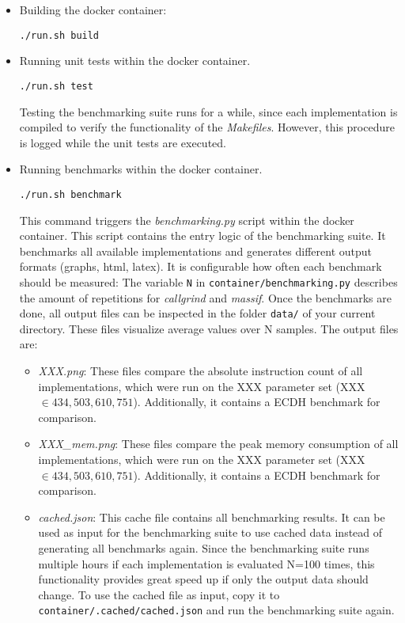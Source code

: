 \begin{itemize}
\item Building the docker container:
\begin{lstlisting}[numbers=none,linewidth=4cm]
./run.sh build
\end{lstlisting}

\item Running unit tests within the docker container.
\begin{lstlisting}[numbers=none,linewidth=4cm]
./run.sh test
\end{lstlisting}
Testing the benchmarking suite runs for a while, since each implementation is compiled to verify the functionality of the \textit{Makefiles}. However, this procedure is logged while the unit tests are executed.

\item Running benchmarks within the docker container.
\begin{lstlisting}[numbers=none,linewidth=4cm]
./run.sh benchmark
\end{lstlisting}
This command triggers the \textit{benchmarking.py} script within the docker container. This script contains the entry logic of the benchmarking suite. It benchmarks all available implementations and generates different output formats (graphs, html, latex). It is configurable how often each benchmark should be measured: The variable \texttt{N} in \texttt{container/benchmarking.py} describes the amount of repetitions for \textit{callgrind} and \textit{massif}. Once the benchmarks are done, all output files can be inspected in the folder \texttt{data/} of your current directory. These files visualize average values over N samples. The output files are:
	\begin{itemize}
	\item \textit{XXX.png}: These files compare the absolute instruction count of all implementations, which were run on the XXX parameter set (XXX $\in {434, 503, 610, 751}$). Additionally, it contains a ECDH benchmark for comparison.
	\item \textit{XXX\_mem.png}: These files compare the peak memory consumption of all implementations, which were run on the XXX parameter set (XXX $\in {434, 503, 610, 751}$). Additionally, it contains a ECDH benchmark for comparison.

	\item \textit{cached.json}: This cache file contains all benchmarking results. It can be used as input for the benchmarking suite to use cached data instead of generating all benchmarks again. Since the benchmarking suite runs multiple hours if each implementation is evaluated N=100 times, this functionality provides great speed up if only the output data should change. To use the cached file as input, copy it to \texttt{container/.cached/cached.json} and run the benchmarking suite again.
	

\end{itemize}
\end{itemize}

